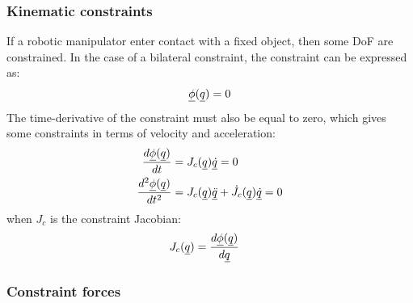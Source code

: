 {\subsubsection{Kinematic constraints}
\label{sec:constraints}
%
If a robotic manipulator enter contact with a fixed object, then some DoF are constrained. In the case of a bilateral constraint, the constraint can be expressed as:
\begin{align}
\underline{\phi}( \underline{ q } ) = 0
\label{eq:constraint}
\end{align}
%
The time-derivative of the constraint must also be equal to zero, which gives some constraints in terms of velocity and acceleration:
\begin{align}
\frac{d \underline{\phi}( \underline{ q } ) }{dt}     &= J_c( \underline{ q } ) \underline{\dot{q}}  = 0 \\
\frac{d^2 \underline{\phi}( \underline{ q } ) }{dt^2} &= J_c( \underline{ q } ) \underline{\ddot{q}}  + \dot{J}_c( \underline{ q } ) \underline{\dot{q}} = 0 
\label{eq:constraint_diff}
\end{align}
%
when $J_c$ is the constraint Jacobian:
%
\begin{align}
J_c( \underline{ q } )                    &= \frac{d \underline{\phi}( \underline{ q } ) }{d\underline{ q }}
\label{eq:constraint_jaco}
\end{align}

\subsubsection{Constraint forces}
\label{sec:constraint_forces}

}
